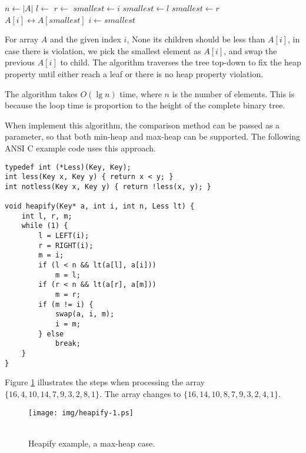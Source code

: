 \documentclass{article}
\begin{document}
\begin{algorithmic}[1]
  \State $n \gets |A|$
  \Loop
    \State $l \gets$ 
    \State $r \gets$ 
    \State $smallest \gets i$
      \State $smallest \gets l$
    \EndIf
      \State $smallest \gets r$
    \EndIf
      \State {} $A[i] \leftrightarrow A[smallest]$
      \State $i \gets smallest$
    \Else
      \State \Return
    \EndIf
  \EndLoop
\EndFunction
\end{algorithmic}

For array $A$ and the given index $i$, None its children
should be less than $A[i]$, in case there is violation, we pick the smallest
element as $A[i]$, and swap the previous $A[i]$ to child.
The algorithm traverses the tree top-down to fix the heap property
until either reach a leaf or there is no heap property violation.

The  algorithm takes $O(\lg n)$ time, where
$n$ is the number of elements. This
is because the loop time is proportion to the height of the complete binary tree.

When implement this algorithm, the comparison method can be passed as
a parameter, so that both min-heap and max-heap can be supported.
The following ANSI C example code uses this approach.

\begin{lstlisting}
typedef int (*Less)(Key, Key);
int less(Key x, Key y) { return x < y; }
int notless(Key x, Key y) { return !less(x, y); }

void heapify(Key* a, int i, int n, Less lt) {
    int l, r, m;
    while (1) {
        l = LEFT(i);
        r = RIGHT(i);
        m = i;
        if (l < n && lt(a[l], a[i]))
            m = l;
        if (r < n && lt(a[r], a[m]))
            m = r;
        if (m != i) {
            swap(a, i, m);
            i = m;
        } else
            break;
    }
}
\end{lstlisting}

Figure \ref{fig:heapify} illustrates the steps when  processing the
array $\{16, 4, 10, 14, 7, 9, 3, 2, 8, 1\}$. The array changes to
$\{16, 14, 10, 8, 7, 9, 3, 2, 4, 1\}$.

\begin{figure}[htbp
    \centering
    \subfloat[Step 1, 14 is the biggest element among 4, 14, and 7. Swap 4 with the left child;]{\texttt{[image: img/heapify-1.ps]}} \\
     \\
    \caption{Heapify example, a max-heap case.} \label{fig:heapify}
\end{figure}
\end{document}
